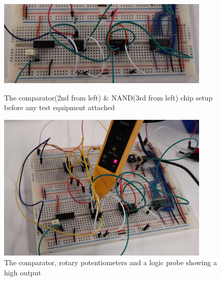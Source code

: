 \begin{figure} [H]
    \centering
    \begin{minipage}[t]{0.45\textwidth}
        \centering
        \includegraphics[width=0.9\textwidth]{images/comparatorTesting1.png}
        \caption{The comparator(2nd from left) \& NAND(3rd from left) chip setup before any test equipment attached}
        \label{fig:comparatorTesting1}
    \end{minipage}\hfill
    \begin{minipage}[t]{0.45\textwidth}
        \centering
        \includegraphics[width=0.9\textwidth]{images/comparatorTesting2.png}
        \caption{The comparator, rotary potentiometers and a logic probe showing a high output}
         \label{fig:comparatorTesting2}
    \end{minipage}
\end{figure}
